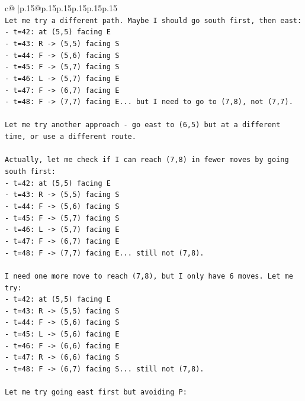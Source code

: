 \documentclass{article}
\begin{document}
{\begin{supertabular}{c@{$\;$}|p{.15\linewidth}@{}p{.15\linewidth}p{.15\linewidth}p{.15\linewidth}p{.15\linewidth}p{.15\linewidth}}
{{{\\ 
\texttt{Let me try a different path. Maybe I should go south first, then east:} \\
\texttt{{-} t=42: at (5,5) facing E} \\
\texttt{{-} t=43: R {-}> (5,5) facing S} \\
\texttt{{-} t=44: F {-}> (5,6) facing S} \\
\texttt{{-} t=45: F {-}> (5,7) facing S} \\
\texttt{{-} t=46: L {-}> (5,7) facing E} \\
\texttt{{-} t=47: F {-}> (6,7) facing E} \\
\texttt{{-} t=48: F {-}> (7,7) facing E... but I need to go to (7,8), not (7,7).} \\
\\ 
\texttt{Let me try another approach {-} go east to (6,5) but at a different time, or use a different route.} \\
\\ 
\texttt{Actually, let me check if I can reach (7,8) in fewer moves by going south first:} \\
\texttt{{-} t=42: at (5,5) facing E} \\
\texttt{{-} t=43: R {-}> (5,5) facing S} \\
\texttt{{-} t=44: F {-}> (5,6) facing S} \\
\texttt{{-} t=45: F {-}> (5,7) facing S} \\
\texttt{{-} t=46: L {-}> (5,7) facing E} \\
\texttt{{-} t=47: F {-}> (6,7) facing E} \\
\texttt{{-} t=48: F {-}> (7,7) facing E... still not (7,8).} \\
\\ 
\texttt{I need one more move to reach (7,8), but I only have 6 moves. Let me try:} \\
\texttt{{-} t=42: at (5,5) facing E} \\
\texttt{{-} t=43: R {-}> (5,5) facing S} \\
\texttt{{-} t=44: F {-}> (5,6) facing S} \\
\texttt{{-} t=45: L {-}> (5,6) facing E} \\
\texttt{{-} t=46: F {-}> (6,6) facing E} \\
\texttt{{-} t=47: R {-}> (6,6) facing S} \\
\texttt{{-} t=48: F {-}> (6,7) facing S... still not (7,8).} \\
\\ 
\texttt{Let me try going east first but avoiding P:} \\
}}}
\end{supertabular}}
\end{document}
